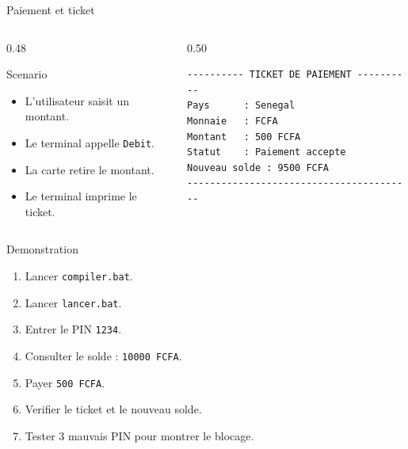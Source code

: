 \documentclass[aspectratio=169,11pt]{beamer}
\begin{document}
\begin{frame}[fragile]{Paiement et ticket}
  \begin{columns}[T]
    \begin{column}{0.48\textwidth}
      \begin{block}{Scenario}
        \begin{itemize}
          \item L'utilisateur saisit un montant.
          \item Le terminal appelle \texttt{Debit}.
          \item La carte retire le montant.
          \item Le terminal imprime le ticket.
        \end{itemize}
      \end{block}
    \end{column}
    \begin{column}{0.50\textwidth}
\begin{lstlisting}
---------- TICKET DE PAIEMENT ----------
Pays      : Senegal
Monnaie   : FCFA
Montant   : 500 FCFA
Statut    : Paiement accepte
Nouveau solde : 9500 FCFA
----------------------------------------
\end{lstlisting}
    \end{column}
  \end{columns}
\end{frame}

\begin{frame}{Demonstration}
  \begin{enumerate}
    \item Lancer \texttt{compiler.bat}.
    \item Lancer \texttt{lancer.bat}.
    \item Entrer le PIN \texttt{1234}.
    \item Consulter le solde : \texttt{10000 FCFA}.
    \item Payer \texttt{500 FCFA}.
    \item Verifier le ticket et le nouveau solde.
    \item Tester 3 mauvais PIN pour montrer le blocage.
  \end{enumerate}
\end{frame}
\end{document}
